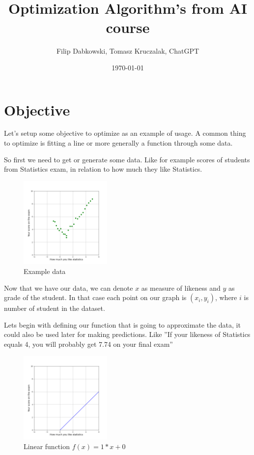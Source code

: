\documentclass{article}
\title{Optimization Algorithm's from AI course}
\author{Filip Dabkowski, Tomasz Kruczalak, ChatGPT}
\date{\today}
\begin{document}
\maketitle

\section{Objective}
Let's setup some objective to optimize as an example of usage. A common thing to optimize is fitting a line or more generally a function through some data.\newline

So first we need to get or generate some data. Like for example scores of students from Statistics exam, in relation to how much they like Statistics.
\begin{figure}[h]
    \centering
    \includegraphics[width=0.4\textwidth]{../images/myplot1.png}
    \caption{Example data}
    \label{fig:data}
\end{figure}

Now that we have our data, we can denote $x$ as measure of likeness and $y$ as grade of the student. In that case each point on our graph is $(x_i, y_i)$, where $i$ is number of student in the dataset.

\break

Lets begin with defining our function that is going to approximate the data, it could also be used later for making predictions. Like ''If your likeness of Statistics equals 4, you will probably get 7.74 on your final exam''

\begin{figure}[h]
    \centering
    \includegraphics[width=0.4\textwidth]{../images/myplot2.png}
    \caption{Linear function $f(x) = 1 * x + 0$}
    \label{fig:data_line}
\end{figure}
\end{document}

